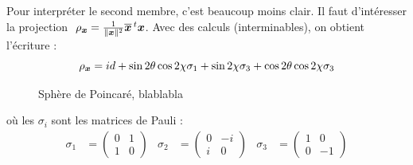Pour interpréter le second membre, c'est beaucoup moins clair. Il faut d'intéresser  la projection  $\ \rho_{\boldsymbol{x}} = \frac{1}{\|\boldsymbol{x} \|^2} \overline{\boldsymbol{x} }\, ^t\boldsymbol{x} $. Avec des calculs (interminables), on obtient l'écriture :
\[\rho_{\boldsymbol{x}} = id + \sin2\theta\cos2\chi \sigma_1 + \sin 2\chi \sigma_3 + \cos2\theta \cos2\chi \sigma_3\]


\begin{figure}
	
	\caption{Sphère de Poincaré, blablabla}
	\label{fig:sphere2pointcare}
\end{figure}

\par
où les $\sigma_i$ sont les matrices de Pauli :
\begin{align*}
	\sigma_1 &= \begin{pmatrix} 0 & 1 \\ 1 &  0 \end{pmatrix}  &
	\sigma_2 &= \begin{pmatrix} 0 & -i \\  i &  0 \end{pmatrix}  &
	\sigma_3 &= \begin{pmatrix} 1 & 0 \\ 0 & -1 \end{pmatrix}
\end{align*}
\par

